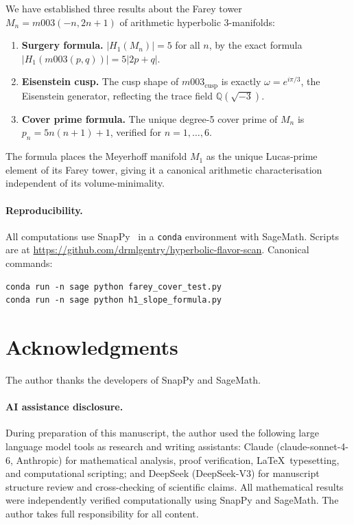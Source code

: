 \documentclass[11pt,a4paper]{article}
\theoremstyle{definition}
\newcommand{\QQ}{\mathbb{Q}}
\newcommand{\Mn}{M_n}
\newcommand{\Mcusp}{m003_{\mathrm{cusp}}}
\begin{document}
We have established three results about the Farey tower
$\Mn = m003(-n,2n+1)$ of arithmetic hyperbolic 3-manifolds:

\begin{enumerate}
\item \textbf{Surgery formula.} $|H_1(\Mn)| = 5$ for all $n$,
  by the exact formula $|H_1(m003(p,q))| = 5|2p+q|$.
\item \textbf{Eisenstein cusp.} The cusp shape of $\Mcusp$ is
  exactly $\omega = e^{i\pi/3}$, the Eisenstein generator,
  reflecting the trace field $\QQ(\sqrt{-3})$.
\item \textbf{Cover prime formula.} The unique degree-5
  cover prime of $\Mn$ is $p_n = 5n(n+1)+1$,
  verified for $n=1,\ldots,6$.
\end{enumerate}

The formula places the Meyerhoff manifold $M_1$ as the unique
Lucas-prime element of its Farey tower, giving it a canonical
arithmetic characterisation independent of its volume-minimality.

\paragraph{Reproducibility.}
All computations use SnapPy~\cite{SnapPy} in a \texttt{conda}
environment with SageMath.
Scripts are at
\url{https://github.com/drmlgentry/hyperbolic-flavor-scan}.
Canonical commands:
\begin{verbatim}
conda run -n sage python farey_cover_test.py
conda run -n sage python h1_slope_formula.py
\end{verbatim}

\section*{Acknowledgments}
The author thanks the developers of SnapPy and SageMath.

\paragraph*{AI assistance disclosure.}
During preparation of this manuscript, the author used the following
large language model tools as research and writing assistants:
Claude (claude-sonnet-4-6, Anthropic) for mathematical analysis,
proof verification, \LaTeX\ typesetting, and computational scripting;
and DeepSeek (DeepSeek-V3) for manuscript structure review and
cross-checking of scientific claims.
All mathematical results were independently verified computationally
using SnapPy and SageMath.
The author takes full responsibility for all content.
\end{document}
